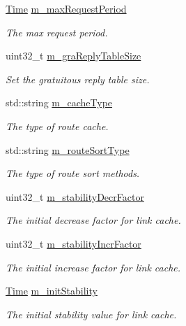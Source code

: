 \begin{DoxyCompactItemize}
\hyperlink{classns3_1_1Time}{Time} \hyperlink{classns3_1_1dsr_1_1DsrRouting_abce8e7bae58dada0db217ca294cb4c6e}{m\+\_\+max\+Request\+Period}
\begin{DoxyCompactList}\small\item\em The max request period. \end{DoxyCompactList}\item 
uint32\+\_\+t \hyperlink{classns3_1_1dsr_1_1DsrRouting_aa22d7408adbcefde51113d45b83d415f}{m\+\_\+gra\+Reply\+Table\+Size}
\begin{DoxyCompactList}\small\item\em Set the gratuitous reply table size. \end{DoxyCompactList}\item 
std\+::string \hyperlink{classns3_1_1dsr_1_1DsrRouting_a07e25fa5f4aebf7b129a31853988045b}{m\+\_\+cache\+Type}
\begin{DoxyCompactList}\small\item\em The type of route cache. \end{DoxyCompactList}\item 
std\+::string \hyperlink{classns3_1_1dsr_1_1DsrRouting_a02b1f61021bb9db1a72bcff2eb4b496d}{m\+\_\+route\+Sort\+Type}
\begin{DoxyCompactList}\small\item\em The type of route sort methods. \end{DoxyCompactList}\item 
uint32\+\_\+t \hyperlink{classns3_1_1dsr_1_1DsrRouting_a4a6db69db44738ae07289fa0993ac916}{m\+\_\+stability\+Decr\+Factor}
\begin{DoxyCompactList}\small\item\em The initial decrease factor for link cache. \end{DoxyCompactList}\item 
uint32\+\_\+t \hyperlink{classns3_1_1dsr_1_1DsrRouting_a9c6b73944ece2adc5f06b5010d9e55f2}{m\+\_\+stability\+Incr\+Factor}
\begin{DoxyCompactList}\small\item\em The initial increase factor for link cache. \end{DoxyCompactList}\item 
\hyperlink{classns3_1_1Time}{Time} \hyperlink{classns3_1_1dsr_1_1DsrRouting_a9b68bafde23cf10e425d341f91da3b5e}{m\+\_\+init\+Stability}
\begin{DoxyCompactList}\small\item\em The initial stability value for link cache. \end{DoxyCompactList}\item 

\end{DoxyCompactItemize}
